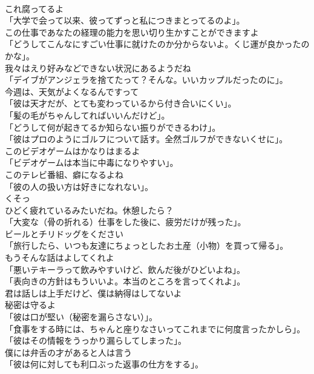 \documentclass[8pt]{extreport}
\begin{document}
\begin{CJK}{UTF8}{min}
\\	これ腐ってるよ	
\\	「大学で会って以来、彼ってずっと私につきまとってるのよ」。	
\\	この仕事であなたの経理の能力を思い切り生かすことができますよ	
\\	「どうしてこんなにすごい仕事に就けたのか分からないよ。くじ運が良かったのかな」。	
\\	我々はえり好みなどできない状況にあるようだね	
\\	「デイブがアンジェラを捨てたって？そんな。いいカップルだったのに」。	
\\	今週は、天気がよくなるんですって	
\\	「彼は天才だが、とても変わっているから付き合いにくい」。	
\\	「髪の毛がちゃんしてればいいんだけど」。	
\\	「どうして何が起きてるか知らない振りができるわけ」。	
\\	「彼はプロのようにゴルフについて話す。全然ゴルフができないくせに」。	
\\	このビデオゲームはかなりはまるよ	
\\	「ビデオゲームは本当に中毒になりやすい」。	
\\	このテレビ番組、癖になるよね	
\\	「彼の人の扱い方は好きになれない」。	
\\	くそっ	
\\	ひどく疲れているみたいだね。休憩したら？	
\\	「大変な（骨の折れる）仕事をした後に、疲労だけが残った」。	
\\	ビールとチリドッグをください	
\\	「旅行したら、いつも友達にちょっとしたお土産（小物）を買って帰る」。	
\\	もうそんな話はよしてくれよ	
\\	「悪いテキーラって飲みやすいけど、飲んだ後がひどいよね」。	
\\	「表向きの方針はもういいよ。本当のところを言ってくれよ」。	
\\	君は話しは上手だけど、僕は納得はしてないよ	
\\	秘密は守るよ	
\\	「彼は口が堅い（秘密を漏らさない）」。	
\\	「食事をする時には、ちゃんと座りなさいってこれまでに何度言ったかしら」。	
\\	「彼はその情報をうっかり漏らしてしまった」。	
\\	僕には弁舌の才があると人は言う	
\\	「彼は何に対しても利口ぶった返事の仕方をする」。	

\end{CJK}
\end{document}
